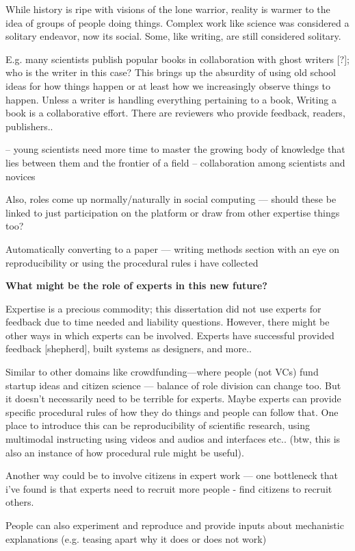 While history is ripe with visions of the lone warrior, reality is warmer to the idea of groups of people doing things. Complex work like science was considered a solitary endeavor, now its social. Some, like writing, are still considered solitary.

E.g. many scientists publish popular books in collaboration with ghost writers [?]; who is the writer in this case? This brings up the absurdity of using old school ideas for how things happen or at least how we increasingly observe things to happen. Unless a writer is handling everything pertaining to a book, Writing a book is a collaborative effort. There are reviewers who provide feedback, readers, publishers.. 

 -- young scientists need more time to master the growing body of knowledge that lies between them and the frontier of a field -- collaboration among scientists and novices

Also, roles come up normally/naturally in social computing — should these be linked to just participation on the platform or draw from other expertise things too?

Automatically converting to a paper — writing methods section with an eye on reproducibility
or using the procedural rules i have collected 

\textbf{What might be the role of experts in this new future?}

Expertise is a precious commodity; this dissertation did not use experts for feedback due to time needed and liability questions. However, there might be other ways in which experts can be involved. Experts have successful provided feedback [shepherd], built systems as designers, and more.. 

Similar to other domains like crowdfunding—where people (not VCs) fund startup ideas  and citizen science — balance of role division can change too. But it doesn’t necessarily need to be terrible for experts. Maybe experts can provide specific procedural rules of how they do things and people can follow that. One place to introduce this can be reproducibility of scientific research, using multimodal instructing using videos and audios and interfaces etc.. (btw, this is also an instance of how procedural rule might be useful).

Another way could be to involve citizens in expert work — one bottleneck that i’ve found is that experts need to recruit more people - find citizens to recruit others. 

People can also experiment and reproduce and provide inputs about mechanistic explanations (e.g. teasing apart why it does or does not work)

